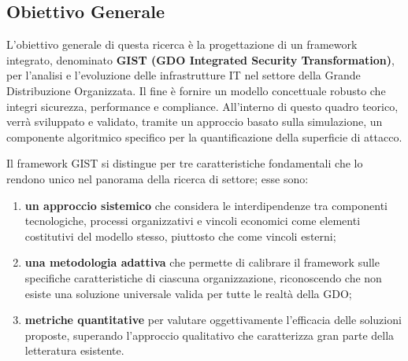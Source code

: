 \subsection{Obiettivo Generale}

\label{ssec:obiettivo_generale}
L'obiettivo generale di questa ricerca è la progettazione di un framework integrato, denominato \textbf{GIST (GDO Integrated Security Transformation)}, per l'analisi e l'evoluzione delle infrastrutture IT nel settore della Grande Distribuzione Organizzata. Il fine è fornire un modello concettuale robusto che integri sicurezza, performance e compliance. All'interno di questo quadro teorico, verrà sviluppato e validato, tramite un approccio basato sulla simulazione, un componente algoritmico specifico per la quantificazione della superficie di attacco.

Il framework GIST si distingue per tre caratteristiche fondamentali che lo rendono unico nel panorama della ricerca di settore; esse sono: 
\begin{enumerate}
    \item  \textbf{un approccio sistemico} che considera le interdipendenze tra componenti tecnologiche, processi organizzativi e vincoli economici come elementi costitutivi del modello stesso, piuttosto che come vincoli esterni;
    \item \textbf{una metodologia adattiva} che permette di calibrare il framework sulle specifiche caratteristiche di ciascuna organizzazione, riconoscendo che non esiste una soluzione universale valida per tutte le realtà della GDO; 
    \item \textbf{metriche quantitative} per valutare oggettivamente l'efficacia delle soluzioni proposte, superando l'approccio qualitativo che caratterizza gran parte della letteratura esistente.
\end{enumerate}


